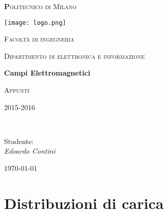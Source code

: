 \documentclass[10pt,a4paper]{report}
\begin{document}
\begin{titlepage}

	\centering
	{\scshape\huge\textbf Politecnico di Milano \par}
	\vspace{0.5cm}

	\texttt{[image: logo.png]}\par\vspace{0.2cm}
	
	{\scshape\small Facoltà di ingegneria\par}
	{\scshape\small Dipartimento di elettronica e informazione\par}
	\vspace{1.5cm}
	{\huge\bfseries Campi Elettromagnetici\par}
	\vspace{1.5cm}
	{\scshape Appunti\par}
	{\scshape\small 2015-2016 \par}
	\vspace{2cm}
	\vfill
    \\[1cm]
	
	\raggedright
    {Studente:\\ \textit{Edoardo Contini}
	
	}\vfill
	\raggedleft
	{\large \today\par}
	
	\end{titlepage}



        \newpage
        \null 
        \thispagestyle{empty} 
        \newpage
        
\tableofcontents
		\newpage
        \null 
        \thispagestyle{empty} 
        \newpage


\chapter{Distribuzioni di carica}
\end{document}

